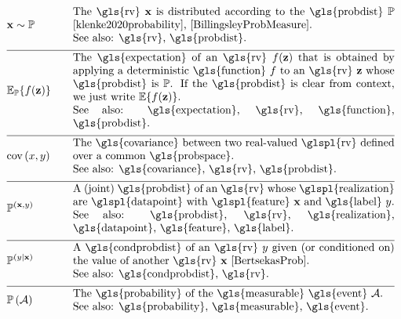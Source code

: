 \begin{align}
	&\featurevec \sim \probdist  &\quad & \parbox{.85\textwidth}{The \gls{rv} $\featurevec$ is distributed according to 
		the \gls{probdist} $\probdist$ \cite{klenke2020probability}, \cite{BillingsleyProbMeasure}.
		\\ See also: \gls{rv}, \gls{probdist}.}  \nonumber \\[2mm] \hline \nonumber\\[-5mm]  
	&\expect_{\probdist} \{ f(\datapoint) \}  &\quad & \parbox{.85\textwidth}{The \gls{expectation} of an \gls{rv} $f(\datapoint)$ that 
		is obtained by applying a deterministic \gls{function} $f$ to an \gls{rv}
		$\datapoint$ whose \gls{probdist} is $\probdist$. 
		If the \gls{probdist} is clear from context, we just write $\expect \{ f(\datapoint) \}$. 
		\\ See also: \gls{expectation}, \gls{rv}, \gls{function}, \gls{probdist}.}  \nonumber \\[2mm] \hline \nonumber\\[-5mm]
	&\cov{x}{y} &\quad & \parbox{.85\textwidth}{The \gls{covariance} between two real-valued \glspl{rv} defined 
		over a common \gls{probspace}. 
		\\ See also: \gls{covariance}, \gls{rv}, \gls{probdist}.}  \nonumber \\[2mm] \hline \nonumber\\[-5mm]
	&\probdist^{(\featurevec,\truelabel)} &\quad & \parbox{.85\textwidth}{A (joint) \gls{probdist} of an \gls{rv} 
		whose \glspl{realization} are \glspl{datapoint} with \glspl{feature} $\featurevec$ and \gls{label} $\truelabel$.
		\\ See also: \gls{probdist}, \gls{rv}, \gls{realization}, \gls{datapoint}, \gls{feature}, 
		\gls{label}.} \nonumber \\[2mm] \hline \nonumber\\[-5mm]
	&\probdist^{(\truelabel|\featurevec)} &\quad & \parbox{.85\textwidth}{A \gls{condprobdist} 
		of an \gls{rv} $\truelabel$ given (or conditioned on) the value of another \gls{rv} $\featurevec$ \cite[Sec.\ 3.5]{BertsekasProb}. 
		\\ See also: \gls{condprobdist}, \gls{rv}. } \nonumber \\[2mm] \hline \nonumber\\[-5mm]
	&\prob{\mathcal{A}} &\quad & \parbox{.85\textwidth}{The \gls{probability} of the \gls{measurable} \gls{event} $\mathcal{A}$. 
		\\ See also: \gls{probability}, \gls{measurable}, \gls{event}.} \nonumber 
\end{align} 

